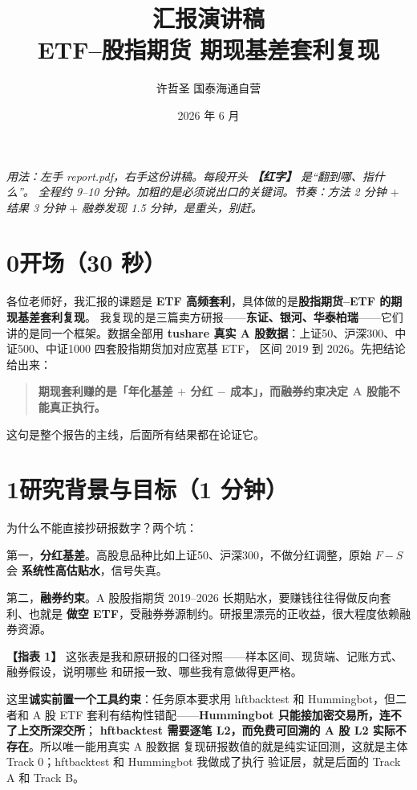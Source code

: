 \documentclass[11pt]{ctexart}
\title{\textbf{汇报演讲稿}\\[3pt]
\large ETF--股指期货 期现基差套利复现}
\author{许哲圣 \quad 国泰海通自营}
\date{2026 年 6 月}
\newcommand{\cue}[1]{{\color{cue}\textbf{【#1】}}}
\begin{document}
\maketitle

\noindent\small\textit{用法：左手 report.pdf，右手这份讲稿。每段开头 \cue{红字} 是``翻到哪、指什么''。
全程约 9--10 分钟。加粗的是必须说出口的关键词。节奏：方法 2 分钟 $+$ 结果 3 分钟 $+$ 融券发现
1.5 分钟，是重头，别赶。}

\section*{0\quad 开场（30 秒）\quad \cue{封面 / 摘要}}
各位老师好，我汇报的课题是 \textbf{ETF 高频套利}，具体做的是\textbf{股指期货--ETF 的期现基差套利复现}。
我复现的是三篇卖方研报——\textbf{东证、银河、华泰柏瑞}——它们讲的是同一个框架。数据全部用
\textbf{tushare 真实 A 股数据}：上证50、沪深300、中证500、中证1000 四套股指期货加对应宽基 ETF，
区间 2019 到 2026。先把结论给出来：

\begin{quote}
\textbf{期现套利赚的是「年化基差 $+$ 分红 $-$ 成本」，而融券约束决定 A 股能不能真正执行。}
\end{quote}
这句是整个报告的主线，后面所有结果都在论证它。

\section*{1\quad 研究背景与目标（1 分钟）\quad \cue{第 1 节，表 1}}
为什么不能直接抄研报数字？两个坑：

第一，\textbf{分红基差}。高股息品种比如上证50、沪深300，不做分红调整，原始 $F-S$ 会
\textbf{系统性高估贴水}，信号失真。

第二，\textbf{融券约束}。A 股股指期货 2019--2026 长期贴水，要赚钱往往得做反向套利、也就是
\textbf{做空 ETF}，受融券券源制约。研报里漂亮的正收益，很大程度依赖融券资源。

\cue{指表 1} 这张表是我和原研报的口径对照——样本区间、现货端、记账方式、融券假设，说明哪些
和研报一致、哪些我有意做得更严格。

这里\textbf{诚实前置一个工具约束}：任务原本要求用 hftbacktest 和 Hummingbot，但二者和 A 股
ETF 套利有结构性错配——\textbf{Hummingbot 只能接加密交易所，连不了上交所深交所}；
\textbf{hftbacktest 需要逐笔 L2，而免费可回溯的 A 股 L2 实际不存在}。所以唯一能用真实 A 股数据
复现研报数值的就是纯实证回测，这就是主体 Track 0；hftbacktest 和 Hummingbot 我做成了执行
验证层，就是后面的 Track A 和 Track B。
\end{document}
